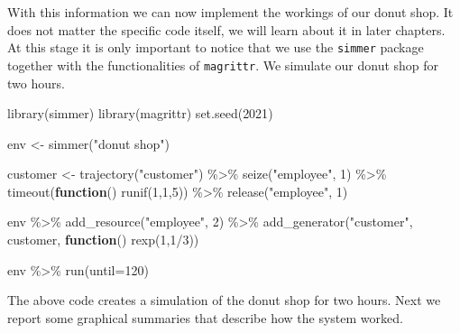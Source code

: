 \documentclass[
]{book}
\newenvironment{Shaded}{\begin{snugshade}}{\end{snugshade}}
\newcommand{\AttributeTok}[1]{\textcolor[rgb]{0.77,0.63,0.00}{#1}}
\newcommand{\ControlFlowTok}[1]{\textcolor[rgb]{0.13,0.29,0.53}{\textbf{#1}}}
\newcommand{\DecValTok}[1]{\textcolor[rgb]{0.00,0.00,0.81}{#1}}
\newcommand{\FunctionTok}[1]{\textcolor[rgb]{0.00,0.00,0.00}{#1}}
\newcommand{\NormalTok}[1]{#1}
\newcommand{\OtherTok}[1]{\textcolor[rgb]{0.56,0.35,0.01}{#1}}
\newcommand{\SpecialCharTok}[1]{\textcolor[rgb]{0.00,0.00,0.00}{#1}}
\newcommand{\StringTok}[1]{\textcolor[rgb]{0.31,0.60,0.02}{#1}}
\theoremstyle{definition}
\theoremstyle{definition}
\theoremstyle{definition}
\theoremstyle{definition}
\theoremstyle{remark}
\begin{document}
With this information we can now implement the workings of our donut shop. It does not matter the specific code itself, we will learn about it in later chapters. At this stage it is only important to notice that we use the \texttt{simmer} package together with the functionalities of \texttt{magrittr}. We simulate our donut shop for two hours.

\begin{Shaded}
\begin{Highlighting}[]
\FunctionTok{library}\NormalTok{(simmer)}
\FunctionTok{library}\NormalTok{(magrittr)}
\FunctionTok{set.seed}\NormalTok{(}\DecValTok{2021}\NormalTok{)}

\NormalTok{env }\OtherTok{\textless{}{-}}  \FunctionTok{simmer}\NormalTok{(}\StringTok{"donut shop"}\NormalTok{)}

\NormalTok{customer }\OtherTok{\textless{}{-}} \FunctionTok{trajectory}\NormalTok{(}\StringTok{"customer"}\NormalTok{) }\SpecialCharTok{\%\textgreater{}\%} \FunctionTok{seize}\NormalTok{(}\StringTok{"employee"}\NormalTok{, }\DecValTok{1}\NormalTok{) }\SpecialCharTok{\%\textgreater{}\%}
  \FunctionTok{timeout}\NormalTok{(}\ControlFlowTok{function}\NormalTok{() }\FunctionTok{runif}\NormalTok{(}\DecValTok{1}\NormalTok{,}\DecValTok{1}\NormalTok{,}\DecValTok{5}\NormalTok{)) }\SpecialCharTok{\%\textgreater{}\%} \FunctionTok{release}\NormalTok{(}\StringTok{"employee"}\NormalTok{, }\DecValTok{1}\NormalTok{) }

\NormalTok{env }\SpecialCharTok{\%\textgreater{}\%}
  \FunctionTok{add\_resource}\NormalTok{(}\StringTok{"employee"}\NormalTok{, }\DecValTok{2}\NormalTok{) }\SpecialCharTok{\%\textgreater{}\%}
  \FunctionTok{add\_generator}\NormalTok{(}\StringTok{"customer"}\NormalTok{, customer, }\ControlFlowTok{function}\NormalTok{() }\FunctionTok{rexp}\NormalTok{(}\DecValTok{1}\NormalTok{,}\DecValTok{1}\SpecialCharTok{/}\DecValTok{3}\NormalTok{))}

\NormalTok{env }\SpecialCharTok{\%\textgreater{}\%}
  \FunctionTok{run}\NormalTok{(}\AttributeTok{until=}\DecValTok{120}\NormalTok{)}
\end{Highlighting}
\end{Shaded}

The above code creates a simulation of the donut shop for two hours. Next we report some graphical summaries that describe how the system worked.
\end{document}
